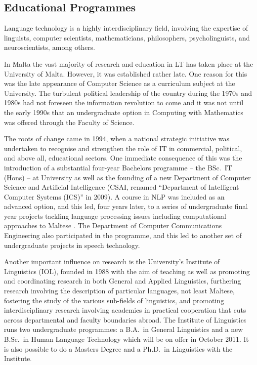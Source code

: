 \begin{multicols}{2}
\subsection{Educational Programmes}

Language technology is a highly interdisciplinary field, involving the expertise of linguists, computer scientists, mathematicians, philosophers, psycholinguists, and neuroscientists, among others. 

In Malta the vast majority of research and education in LT has taken place at the University of Malta. However, it was established rather late. One reason for this was the late appearance of Computer Science as a curriculum subject at the University. The turbulent political leadership of the country during the 1970s and 1980s had not foreseen the information revolution to come and it was not until the early 1990s that an undergraduate option in Computing with Mathematics was offered through the Faculty of Science. 

The roots of change came in 1994, when a national strategic initiative was undertaken to recognise and strengthen the role of IT in commercial, political, and above all, educational sectors. One immediate consequence of this was the introduction of a substantial four-year Bachelors programme -- the BSc.~IT (Hons) -- at University as well as the founding of a new Department of Computer Science and Artificial Intelligence (CSAI, renamed ``Department of Intelligent Computer Systems (ICS)'' in 2009). A course in NLP was included as an advanced option, and this led, four years later, to a series of undergraduate final year projects tackling language processing issues including computational approaches to Maltese \cite{Galea:1999, Mangion:1999, Farrugia:1999, Farrugia:2000, Mizzi:2000, Bajada:2004, Attard:2005, Farrugia:2008, Farrugia:2009, Vella:2010}. The Department of Computer Communications Engineering also participated in the programme, and this led to another set of undergraduate projects in speech technology.

Another important influence on research is the University’s Institute of Linguistics (IOL), founded in 1988 with the aim of teaching as well as promoting and coordinating research in both General and Applied Linguistics, furthering research involving the description of particular languages, not least Maltese, fostering the study of the various sub-fields of linguistics, and promoting interdisciplinary research involving academics in practical cooperation that cuts across departmental and faculty boundaries abroad. The Institute of Linguistics runs two undergraduate programmes: a B.A.~in General Linguistics and a new B.Sc.~in Human Language Technology which will be on offer in October 2011. It is also possible to do a Masters Degree and a Ph.D.~in Linguistics with the Institute.


\end{multicols}

